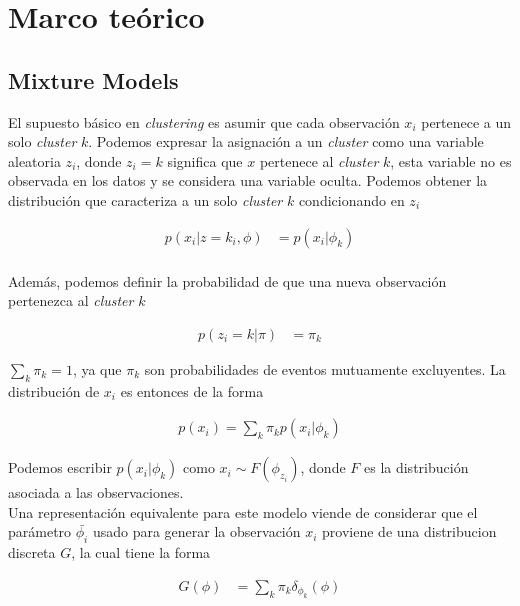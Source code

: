 \documentclass[letterpaper,12pt,oneside]{book} %
\begin{document}

\chapter{Marco teórico}
\section{Mixture Models}
\label{sec:mixture_model}

El supuesto básico en \textit{clustering} es asumir que cada observación $x_{i}$ pertenece a un solo \textit{cluster} $k$. Podemos expresar la asignación a un \textit{cluster} como una variable aleatoria $z_{i}$, donde $z_{i}=k$ significa que $x$ pertenece al \textit{cluster} $k$, esta variable no es observada en los datos y se considera una variable oculta. Podemos obtener la distribución que caracteriza a un solo \textit{cluster} $k$ condicionando en $z_{i}$

\begin{align}
    p(x_{i}|z=k_{i}, \phi) & = p(x_{i}|\phi_{k})\\
\end{align}

Además, podemos definir la probabilidad de que una nueva observación pertenezca al \textit{cluster} $k$ 

\begin{align}
    p(z_{i}=k|\pi) & = \pi_{k}
\end{align}

$\sum_{k}\pi_{k} = 1$, ya que $\pi_{k}$ son probabilidades de eventos mutuamente excluyentes. La distribución de $x_{i}$ es entonces de la forma

\begin{align}
    p(x_{i}) = \sum_{k}\pi_{k}p(x_{i}|\phi_{k})
\end{align}

Podemos escribir $p(x_{i}|\phi_{k})$ como $x_{i} \sim F(\phi_{z_{i}})$, donde $F$ es la distribución asociada a las observaciones. \\

Una representación equivalente para este modelo viende de considerar que el parámetro $\bar{\phi_{i}}$ usado para generar la observación $x_{i}$ proviene de una distribucion discreta $G$, la cual tiene la forma

\begin{align}
    G(\phi) & = \sum_{k} \pi_{k}\delta_{\phi_{k}}(\phi)
\end{align}
\end{document}
